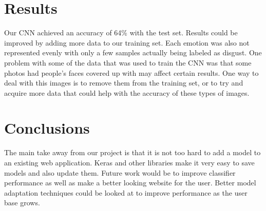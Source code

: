 \documentclass[conference]{IEEEtran}
\begin{document}
\section{Results}
Our CNN achieved an accuracy of 64\% with the test set. Results could be improved by 
adding more data to our training set. Each emotion was also not represented evenly with 
only a few samples actually being labeled as disgust. One problem with some of the data 
that was used to train the CNN was that some photos had people's faces covered up with 
may affect certain results. One way to deal with this images is to remove them from the 
training set, or to try and acquire more data that could help with the accuracy of these 
types of images.

\section{Conclusions}
The main take away from our project is that it is not too hard to add a model to an 
existing web application. Keras and other libraries make it very easy to save models and 
also update them. Future work would be to improve classifier performance as well as make 
a better looking website for the user. Better model adaptation techniques could be looked 
at to improve performance as the user base grows.
\end{document}
